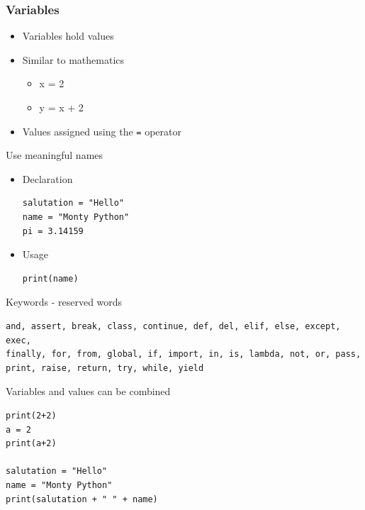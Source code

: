 \documentclass[10pt, a4paper]{beamer} %
\begin{document}
\begin{frame}\frametitle{Variables}
    \begin{itemize}
        \item Variables hold values
        \item Similar to mathematics
        \begin{itemize}
            \item x = 2
            \item y = x + 2
        \end{itemize}
        \item Values assigned using the \texttt{=} operator
    \end{itemize}
    \begin{examples}
    Use meaningful names
    \begin{itemize}
        \item Declaration
        \begin{lstlisting}
salutation = "Hello"
name = "Monty Python"
pi = 3.14159
        \end{lstlisting}
        \item Usage
        \begin{lstlisting}
print(name)
        \end{lstlisting}
    \end{itemize}
        
    \end{examples}
\framebreak
\begin{block}{Keywords - reserved words}

\begin{lstlisting}
and, assert, break, class, continue, def, del, elif, else, except, exec, 
finally, for, from, global, if, import, in, is, lambda, not, or, pass, 
print, raise, return, try, while, yield
\end{lstlisting}
    
\end{block}
\framebreak
\begin{block}{Variables and values can be combined}
    \begin{lstlisting}
print(2+2)
a = 2
print(a+2)

salutation = "Hello"
name = "Monty Python"
print(salutation + " " + name)
    \end{lstlisting}
\end{block}
\end{frame}
\end{document}
